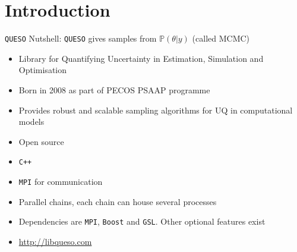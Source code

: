 \section{Introduction}
\begin{frame}{\texttt{QUESO}}
  Nutshell: \texttt{QUESO} gives samples from $\mathbb{P}(\theta | y)$ (called MCMC)
  \begin{itemize}
    \item Library for Quantifying Uncertainty in Estimation, Simulation and Optimisation
    \item Born in 2008 as part of PECOS PSAAP programme
    \item Provides robust and scalable sampling algorithms for UQ in computational models
    \item Open source
    \item \texttt{C++}
    \item \texttt{MPI} for communication
    \item Parallel chains, each chain can house several processes
    \item Dependencies are \texttt{MPI}, \texttt{Boost} and \texttt{GSL}.  Other optional features exist
    \item \textcolor{blue}{\url{http://libqueso.com}}
  \end{itemize}
\end{frame}

